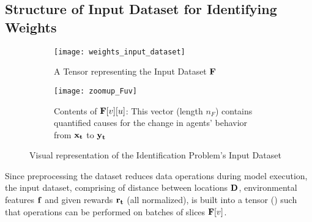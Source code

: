 \subsection{Structure of Input Dataset for Identifying Weights} \label{sec:Structure of Input Dataset for Identifying Weights}
\begin{figure}[!htbp]
    \begin{subfigure}{.64\textwidth}
        \centering
        \texttt{[image: weights\_input\_dataset]}
        \caption{A Tensor representing the Input Dataset $\mathbf{F}$}
        \label{fig:A Tensor representing the complete Input Dataset}
    \end{subfigure}
    \begin{subfigure}{.35\textwidth}
        \centering
        \texttt{[image: zoomup\_Fuv]}
        \caption{Contents of $\mathbf{F}[v][u]$: This vector (length $n_F$) contains quantified causes for the change in agents' behavior from $\mathbf{x_t}$ to $\mathbf{y_t}$}
        \label{fig:Zoomed-in contents of Fvu}
    \end{subfigure}
    \caption{Visual representation of the Identification Problem's Input Dataset}
    \label{fig:Visual representation of the Identification Problem's Input Dataset}
\end{figure}
Since preprocessing the dataset reduces data operations during model execution, the input dataset, comprising of distance between locations $\mathbf{D}$, environmental features $\mathbf{f}$ and given rewards $\mathbf{r_t}$ (all normalized), is built into a tensor () such that operations can be performed on batches of slices $\mathbf{F}[v]$.

